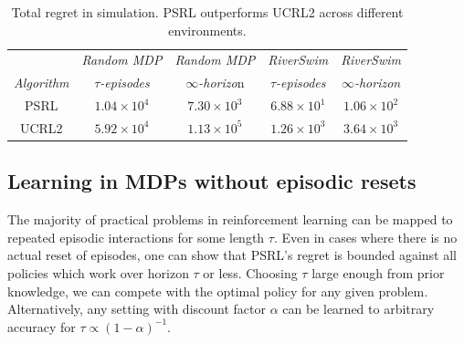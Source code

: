 
\begin{table}[h!]
\begin{center}
\caption{Total regret in simulation. PSRL outperforms UCRL2 across different environments.}
\begin{tabular}{| c | c c | c c | }
\hline
				& \emph{Random MDP}	& \emph{Random MDP}	& \emph{RiverSwim} & \emph{RiverSwim} \\
\emph{Algorithm}		& $\tau$\emph{-episodes}	& $\infty$\emph{-horizo}n 	& $\tau$\emph{-episodes}	& $\infty$\emph{-horizon} 	\\
\hline
	PSRL		& $1.04 \times 10^4$& $7.30 \times 10^3$&$6.88 \times 10^1$	& $1.06 \times 10^2$ \\
	UCRL2		&$5.92 \times 10^4$	& $1.13 \times 10^5$&$1.26 \times 10^3$	& $3.64 \times 10^3$ \\
\hline
\end{tabular}
\end{center}
\label{table: AveRewards}
\end{table}

\subsection{Learning in MDPs without episodic resets}
The majority of practical problems in reinforcement learning can be mapped to repeated episodic interactions for some length $\tau$. Even in cases where there is no actual reset of episodes, one can show that PSRL's regret is bounded against all policies which work over horizon $\tau$ or less\cite{brafman2003r}. Choosing $\tau$ large enough from prior knowledge, we can compete with the optimal policy for any given problem. Alternatively, any setting with discount factor $\alpha$ can be learned to arbitrary accuracy for $\tau \propto (1-\alpha)^{-1}$.

